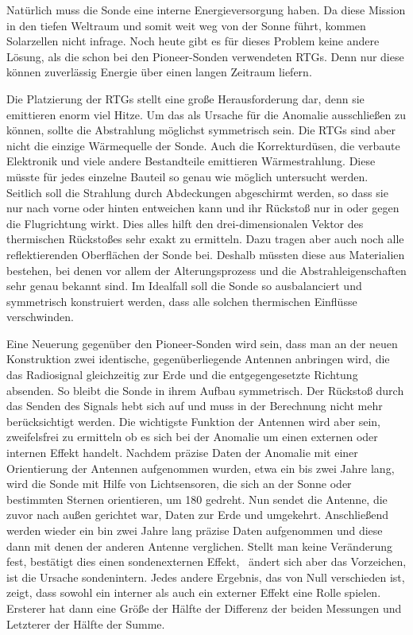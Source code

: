 \bigskip

Nat\"urlich muss die Sonde eine interne Energieversorgung haben. Da
diese Mission in den tiefen Weltraum und somit weit weg von der Sonne
f\"uhrt, kommen Solarzellen nicht in\-frage. Noch heute gibt es f\"ur
dieses Problem keine andere L\"osung, als die schon bei den
Pioneer-Sonden verwendeten RTGs. Denn nur diese k\"onnen zuverl\"assig
Energie \"uber einen langen Zeitraum liefern.


\bigskip

Die Platzierung der RTGs stellt eine gro{\ss}e Herausforderung dar, denn
sie emittieren enorm viel Hitze. Um das als Ursache f\"ur die Anomalie
ausschlie{\ss}en zu k\"onnen, sollte die Abstrahlung m\"oglichst
symmetrisch sein. Die RTGs sind aber nicht die einzige W\"arme\-quelle
der Sonde. Auch die Korrekturd\"usen, die verbaute Elektronik und viele
andere Bestandteile emittieren W\"armestrahlung. Diese m\"usste f\"ur
jedes einzelne Bauteil so genau wie m\"oglich untersucht werden.
Seitlich soll die Strahlung durch Abdeckungen abge\-schirmt werden, so
dass sie nur nach vorne oder hinten entweichen kann und ihr
R\"ucksto{\ss} nur in oder gegen die Flugrichtung wirkt. Dies alles
hilft den drei-dimensionalen Vektor des thermischen R\"ucksto{\ss}es
sehr exakt zu ermitteln. Dazu tragen aber auch noch alle
reflektierenden Oberfl\"achen der Sonde bei. Deshalb m\"ussten diese
aus Materialien beste\-hen, bei denen vor allem der Alterungsprozess
und die Abstrahleigenschaften sehr genau bekannt sind. Im Idealfall
soll die Sonde so ausbalanciert und symmetrisch konstruiert werden,
dass alle solchen thermischen Einfl\"usse verschwinden.


\bigskip

Eine Neuerung gegen\"uber den Pioneer-Sonden wird sein, dass man an der
neuen Kon\-struktion zwei identische, gegen\"uberliegende Antennen
anbringen wird, die das Radiosi\-gnal gleichzeitig zur Erde und die
entgegengesetzte Richtung absenden. So bleibt die Son\-de in ihrem
Aufbau symmetrisch. Der R\"ucksto{\ss} durch das Senden des Signals
hebt sich auf und muss in der Berechnung nicht mehr ber\"ucksichtigt
werden. Die wichtigste Funktion der Antennen wird aber sein,
zweifelsfrei zu ermitteln ob es sich bei der Anomalie um einen externen
oder internen Effekt handelt. Nachdem pr\"azise Daten der Anomalie mit
einer Orientierung der Antennen aufgenommen wurden, etwa ein bis zwei
Jahre lang, wird die Sonde mit Hilfe von Lichtsensoren, die sich an der
Sonne oder bestimmten Sternen orientieren, um 180{\textdegree} gedreht.
Nun sendet die Antenne, die zuvor nach au{\ss}en gerichtet war, Daten
zur Erde und umgekehrt. Anschlie{\ss}end werden wieder ein bin zwei
Jahre lang pr\"azise Daten aufgenommen und diese dann mit denen der
anderen Antenne verglichen. Stellt man keine Ver\"anderung fest,
best\"atigt dies einen sondenexternen Effekt, \ \"andert sich aber das
Vorzeichen, ist die Ursache sondenintern. Jedes andere Ergebnis, das
von Null verschieden ist, zeigt, dass sowohl ein interner als auch ein
externer Effekt eine Rolle spielen. Ersterer hat dann eine Gr\"o{\ss}e
der H\"alfte der Differenz der beiden Messungen und Letzterer der
H\"alfte der Summe. 



